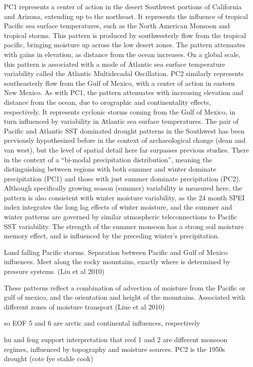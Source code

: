 \documentclass[fleqn,10pt]{wlscirep}
\begin{document}
PC1 represents a center of action in the desert Southwest portions of California and Arizona, extending up to the northeast. It represents the influence of tropical Pacific sea surface temperatures, such as the North American Monsoon and tropical storms. This pattern is produced by southwesterly flow from the tropical pacific, bringing moisture up across the low desert zones. The pattern attenuates with gains in elevation, as distance from the ocean increases. On a global scale, this pattern is associated with a mode of Atlantic sea surface temperature variability called the Atlantic Multidecadal Oscillation. PC2 similarly represents southeasterly flow from the Gulf of Mexico, with a center of action in eastern New Mexico. As with PC1, the pattern attenuates with increasing elevation and distance from the ocean, due to orographic and continentality effects, respectively. It represents cyclonic storms coming from the Gulf of Mexico, in turn influenced by variability in Atlantic sea surface temperatures. The pair of Pacific and Atlantic SST dominated drought patterns in the Southwest has been previously hypothesized before in the context of archaeological change (dean and van west), but the level of spatial detail here far surpasses previous studies. There in the context of a ``bi-modal precipitation distribution'', meaning the distinguishing between regions with both summer and winter dominate precipitation (PC1) and those with just summer dominate precipitation (PC2). Although specifically growing season (summer) variability is measured here, the pattern is also consistent with winter moisture variability, as the 24 month SPEI index integrates the long lag effects of winter moisture, and the summer and winter patterns are governed by similar atmospheric teleconnections to Pacific SST variability. The strength of the summer monsoon has a strong soil moisture memory effect, and is influenced by the preceding winter's precipitation.

Land falling Pacific storms. Separation between Pacific and Gulf of Mexico influences. Meet along the rocky mountains, exactly where is determined by pressure systems. (Liu et al 2010)

These patterns reflect a combination of advection of moisture from the Pacific or gulf of mexico, and the orientation and height of the mountains.
Associated with different zones of moisture transport (Liue et al 2010)

so EOF 5 and 6 are arctic and continental influences, respectively

hu and feng support interpretation that reof 1 and 2 are different monsoon regimes, influenced by topography and moisture sources.
PC2 is the 1950s drought (cote fye stahle cook)
\end{document}
